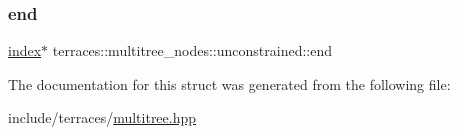 \subsubsection{\texorpdfstring{end}{end}}
{\footnotesize\ttfamily \hyperlink{namespaceterraces_adbc33ccb543d1634e96d0eb02e472c77}{index}$\ast$ terraces\+::multitree\+\_\+nodes\+::unconstrained\+::end}



The documentation for this struct was generated from the following file\+:\begin{DoxyCompactItemize}
\item 
include/terraces/\hyperlink{multitree_8hpp}{multitree.\+hpp}\end{DoxyCompactItemize}
